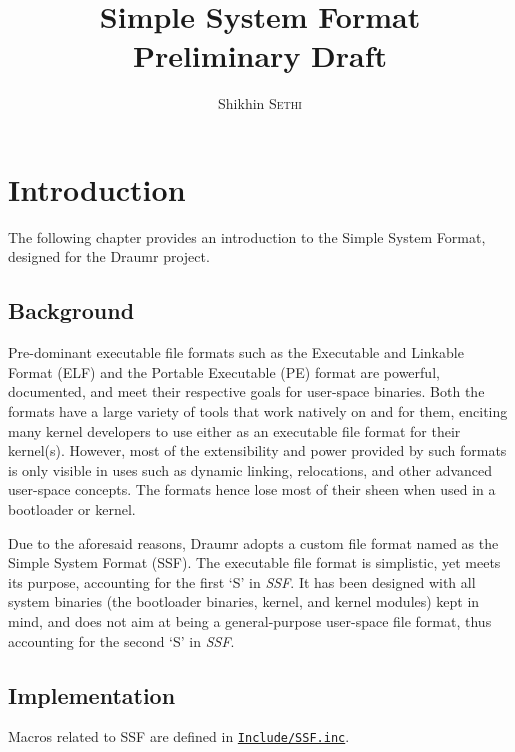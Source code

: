 \documentclass[a4paper,oneside]{memoir}
\begin{document}
\title{Simple System Format\\\small Preliminary Draft}
\author{Shikhin \textsc{Sethi}}
\maketitle

\clearpage

\tableofcontents
\listoftables

\chapter{Introduction}

The following chapter provides an introduction to the Simple System Format, designed for the Draumr project.

\section{Background}

Pre-dominant executable file formats such as the Executable and Linkable Format (ELF) and the Portable Executable (PE) format are powerful, documented, and meet their respective goals for user-space binaries. Both the formats have a large variety of tools that work natively on and for them, enciting many kernel developers to use either as an executable file format for their kernel(s). However, most of the extensibility and power provided by such formats is only visible in uses such as dynamic linking, relocations, and other advanced user-space concepts. The formats hence lose most of their sheen when used in a bootloader or kernel.

Due to the aforesaid reasons, Draumr adopts a custom file format named as the Simple System Format (SSF). The executable file format is simplistic, yet meets its purpose, accounting for the first `S' in \emph{SSF}. It has been designed with all system binaries (the bootloader binaries, kernel, and kernel modules) kept in mind, and does not aim at being a general-purpose user-space file format, thus accounting for the second `S' in \emph{SSF}.

\section{Implementation}

Macros related to SSF are defined in \texttt{\href{run:./../Include/SSF.inc}{Include/SSF.inc}}.
\end{document}

